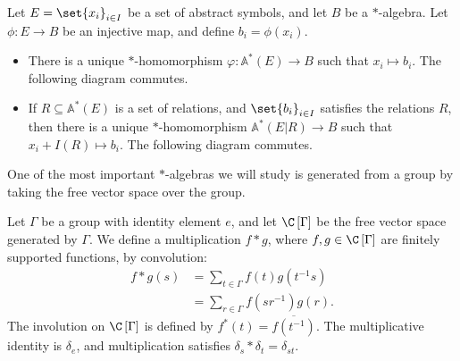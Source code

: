 \begin{theorem}
  Let $E = \set{x_i}_{i\in I}$ be a set of abstract symbols, and let $B$ be a $\ast$-algebra. Let $\phi\colon E\rightarrow B$ be an injective map, and define $b_i = \phi\left(x_i\right)$.
  \begin{itemize}
    \item There is a unique $\ast$-homomorphism $\varphi\colon \mathbb{A}^{\ast}\left(E\right) \rightarrow B$ such that $x_i \mapsto b_i$. The following diagram commutes.
      \begin{center}
      \end{center}
    \item If $R\subseteq \mathbb{A}^{\ast}\left(E\right)$ is a set of relations, and $\set{b_i}_{i\in I}$ satisfies the relations $R$, then there is a unique $\ast$-homomorphism $\mathbb{A}^{\ast}\left(E|R\right) \rightarrow B$ such that $x_i + I(R) \mapsto b_i$. The following diagram commutes.
      \begin{center}
      \end{center}
  \end{itemize}
\end{theorem}
One of the most important $\ast$-algebras we will study is generated from a group by taking the free vector space over the group.
\begin{definition}
  Let $\Gamma$ be a group with identity element $e$, and let $\C\left[\Gamma\right]$ be the free vector space generated by $\Gamma$. We define a multiplication $f \ast g$, where $f,g\in \C\left[\Gamma\right]$ are finitely supported functions, by convolution:
  \begin{align*}
    f\ast g(s) &= \sum_{t\in\Gamma}f(t)g\left(t^{-1}s\right)\\
               &= \sum_{r\in\Gamma}f\left(sr^{-1}\right)g\left(r\right).
  \end{align*}
  The involution on $\C\left[\Gamma\right]$ is defined by $f^{\ast}\left(t\right) = \overline{f\left(t^{-1}\right)}$. The multiplicative identity is $\delta_e$, and multiplication satisfies $\delta_s\ast \delta_t = \delta_{st}$.
\end{definition}
